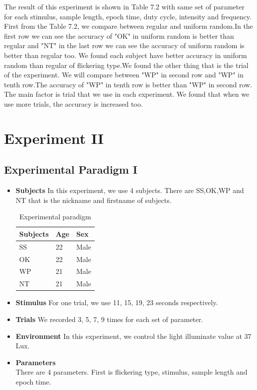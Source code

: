 The result of this experiment is shown in Table 7.2 with same set of parameter for each stimulus, sample length, epoch time, duty cycle, intensity and frequency. First from the Table 7.2, we compare between regular and uniform random.In the first row we can see the accuracy of "OK" in uniform random is better than regular and "NT" in the last row we can see the accuracy of uniform random is better than regular too. We found each subject have better accuracy in uniform random than regular of flickering type.We found the other thing that is the trial of the experiment. We will compare between "WP" in second row and "WP" in tenth row.The accuracy of "WP" in tenth row is better than "WP" in second row. The main factor is trial that we use in each experiment. We found that when we use more trials, the accuracy is increased too.

\newpage
\section{Experiment II}
\subsection{Experimental Paradigm I}
\begin{itemize}
\item{\textbf{Subjects}}\newline
In this experiment, we use 4 subjects. There are SS,OK,WP and NT that is the nickname and firstname of subjects.


\begin{table}[ht]
\centering
\begin{tabular}{| P{.2\linewidth} | P{.2\linewidth} | P{.2\linewidth} |}
			\hline 
			\textbf{Subjects} & \textbf{Age}  & \textbf{Sex}\\
			\hline 
			SS & 22 & Male\\
			\hline 
			OK & 22 & Male\\
			\hline 
			WP & 21 & Male\\
			\hline 
			NT & 21 & Male\\
			\hline
		\end{tabular}       
\caption{Experimental paradigm}
\label{table:2}
\end{table}

\item{\textbf{Stimulus}}
For one trial, we use 11, 15, 19, 23 seconds respectively.
\item{\textbf{Trials}}
We recorded 3, 5, 7, 9 times for each set of parameter.
\item{\textbf{Environment}}
In this experiment, we control the light illuminate value at 37 Lux.
	\item{\textbf{Parameters}}\\
There are 4 parameters. First is flickering type, stimulus, sample length and epoch time.
\end{itemize}

